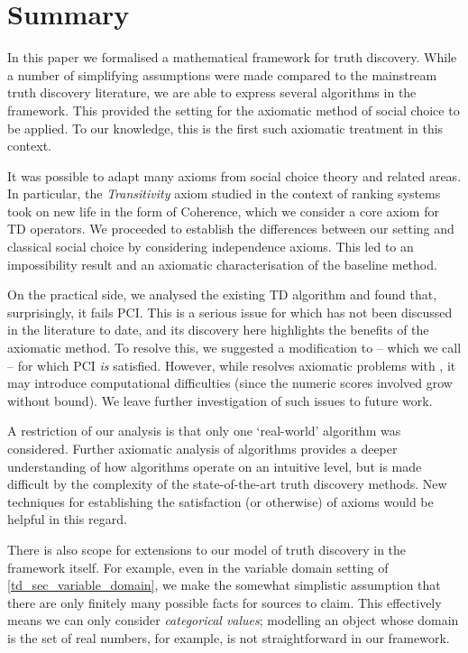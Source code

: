 \section{Summary}
\label{td_sec_conclusion}

In this paper we formalised a mathematical framework for truth discovery. While
a number of simplifying assumptions were made compared to the mainstream truth
discovery literature, we are able to express several algorithms in the
framework. This provided the setting for the axiomatic method of social choice
to be applied. To our knowledge, this is the first such axiomatic treatment in
this context.

It was possible to adapt many axioms from social choice theory and related
areas. In particular, the \emph{Transitivity} axiom studied in the context of
ranking systems~\cite{tennenholtz2004,altman2008} took on new life in the form
of Coherence, which we consider a core axiom for TD operators.
We proceeded to establish the differences between our setting and classical
social choice by considering independence axioms. This led to an impossibility
result and an axiomatic characterisation of the baseline \voting{} method.

On the practical side, we analysed the existing TD algorithm \sums{} and found
that, surprisingly, it fails PCI. This is a serious issue for \sums{} which has
not been discussed in the literature to date, and its discovery here highlights
the benefits of the axiomatic method. To resolve this, we suggested a
modification to \sums{} -- which we call \usums{} -- for which PCI \emph{is}
satisfied. However, while \usums{} resolves axiomatic problems with \sums{}, it
may introduce computational difficulties (since the numeric scores involved
grow without bound). We leave further investigation of such issues to future
work.

A restriction of our analysis is that only one `real-world' algorithm was
considered. Further axiomatic analysis of algorithms provides a deeper
understanding of how algorithms operate on an intuitive level, but is made
difficult by the complexity of the state-of-the-art truth discovery methods.
New techniques for establishing the satisfaction (or otherwise) of axioms would
be helpful in this regard.

There is also scope for extensions to our model of truth discovery in the
framework itself. For example, even in the variable domain setting of
\cref{td_sec_variable_domain}, we make the somewhat simplistic assumption that
there are only finitely many possible facts for sources to claim. This
effectively means we can only consider \emph{categorical values}; modelling an
object whose domain is the set of real numbers, for example, is not
straightforward in our framework.


